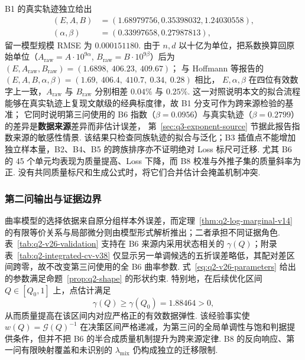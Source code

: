 B1 的真实轨迹独立给出
\begin{align*}
(E,A,B)&=(1.68979756,0.35398032,1.24030558),\\
(\alpha,\beta)&=(0.33997658,0.27987813),
\end{align*}
留一模型规模 RMSE 为 $0.000151180$. 由于 $n,d$ 以十亿为单位，把系数换算回原始单位（$A_{\mathrm{raw}}=A\cdot10^{9\alpha}$, $B_{\mathrm{raw}}=B\cdot10^{9\beta}$）后为
$(E,A_{\mathrm{raw}},B_{\mathrm{raw}})=(1.6898,\ 406.23,\ 409.67)$；
与 Hoffmann 等报告的 $(E,A,B,\alpha,\beta)=(1.69,\ 406.4,\ 410.7,\ 0.34,\ 0.28)$\cite{hoffmann} 相比，
$E,\alpha,\beta$ 在四位有效数字上一致，$A_{\mathrm{raw}}$ 与 $B_{\mathrm{raw}}$ 分别相差 $0.04\%$ 与 $0.25\%$. 
这一对照说明本文的拟合流程能够在真实轨迹上复现文献级的经典标度律，故 B1 分支可作为跨来源检验的基准；
它同时说明第三问使用的 B6 指数（$\beta=0.0956$）与真实轨迹（$\beta=0.2799$）的差异是\textbf{数据来源}差异而非估计误差，
第~\ref{sec:q3-exponent-source} 节据此报告指数来源的敏感性情景. 
该结果只检查同族轨迹的拟合与泛化；B3 插值点不能增加独立样本量，B2、B4、B5 的跨族排序亦不证明绝对 Loss 标尺可迁移. 尤其 B6 的 45 个单元均表现为质量提高、Loss 下降，而 B8 校准与外推子集的质量斜率为正. 没有共同质量标尺和生成公式时，将它们合并估计会掩盖机制冲突. 

\subsubsection{第二问输出与证据边界}
曲率模型的选择依据来自原分组样本外误差，而定理~\ref{thm:q2-log-marginal-v14} 的有限等价关系与局部微分则由模型形式解析推出；二者承担不同证据角色. 表~\ref{tab:q2-v26-validation} 支持在 B6 来源内采用状态相关的 $\gamma(Q)$；附录表~\ref{tab:q2-integrated-cv-v38} 仅显示另一单调候选的五折误差略低，其配对差区间跨零，故不改变第三问使用的全 B6 曲率参数. 式~\eqref{eq:q2-v26-parameters} 给出的参数满足命题~\ref{prop:q2-shape} 的形状约束. 特别地，在后续优化区间 $Q\in[Q_0,1]$ 上，点估计满足
\[
\gamma(Q)\ge \gamma(Q_0)=1.88464>0,
\]
从而质量提高在该区间内对应严格正的有效数据弹性. 该经验事实使 $w(Q)=\mathcal G(Q)^{-1}$ 在决策区间严格递减，为第三问的全局单调性与饱和判据提供条件，但并不把 B6 的半合成质量机制提升为跨来源定律. B8 的反向响应、第一问有限映射覆盖和未识别的 $\lambda_{\mathrm{mix}}$ 仍构成独立的迁移限制. 
